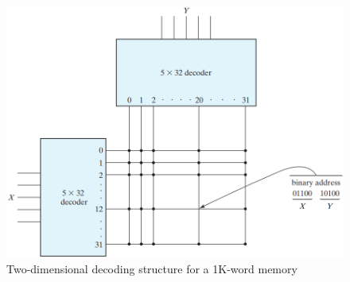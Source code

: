 \begin{figure}[H]
  \centering
  \includegraphics[width=\linewidth]{img/fig-7.7.png}
  \caption{Two-dimensional decoding structure for a 1K-word memory}
  \label{fig:7.7}
\end{figure}

